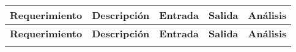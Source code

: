 {\small
      \begin{longtable}[c]{c p{3.5cm} p{2.2cm} p{2.2cm} p{3.5cm}}
            \hline
            \textbf{Requerimiento} & \textbf{Descripción}                                                                                    & \textbf{Entrada}                                                 & \textbf{Salida}                                                       & \textbf{Análisis}                                                                                                                                  \\
            \hline
            \endfirsthead

            \hline
            \textbf{Requerimiento} & \textbf{Descripción}                                                                                    & \textbf{Entrada}                                                 & \textbf{Salida}                                                       & \textbf{Análisis}                                                                                                                                  \\
            \hline
            \endhead
            \endfoot
            \endlastfoot


\end{longtable}}

